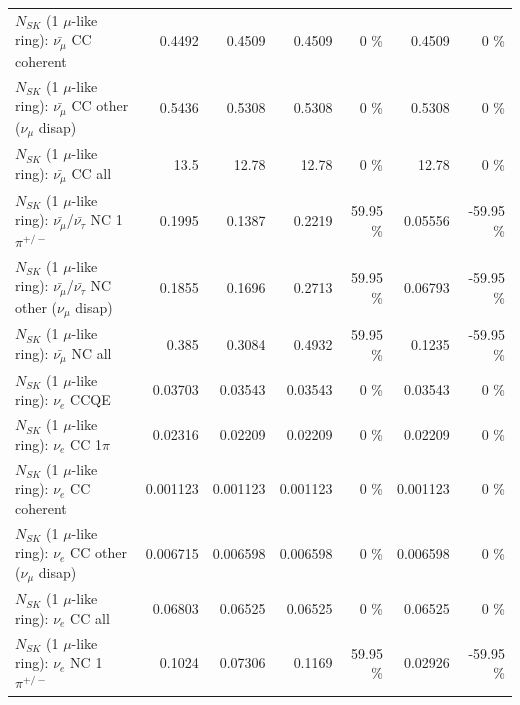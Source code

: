 \begin{table}
\begin{tabular}{| l | r | r | r  r | r  r |}
                       $N_{SK}$ (1 $\mu$-like ring): $\bar{\nu_\mu}$ CC coherent &          0.4492 &          0.4509 &          0.4509 &        0 \%  &          0.4509 &        0 \%  \\ 
        $N_{SK}$ (1 $\mu$-like ring): $\bar{\nu_\mu}$ CC other ($\nu_\mu$ disap) &          0.5436 &          0.5308 &          0.5308 &        0 \%  &          0.5308 &        0 \%  \\ 
                          $N_{SK}$ (1 $\mu$-like ring): $\bar{\nu_{\mu}}$ CC all &            13.5 &           12.78 &           12.78 &        0 \%  &           12.78 &        0 \%  \\ 
\hline
  $N_{SK}$ (1 $\mu$-like ring): $\bar{\nu_\mu}$/$\bar{\nu_\tau}$ NC 1$\pi^{+/-}$ &          0.1995 &          0.1387 &          0.2219 &    59.95 \%  &         0.05556 &   -59.95 \%  \\ 
$N_{SK}$ (1 $\mu$-like ring): $\bar{\nu_\mu}$/$\bar{\nu_\tau}$ NC other ($\nu_\mu$ disap) &          0.1855 &          0.1696 &          0.2713 &    59.95 \%  &         0.06793 &   -59.95 \%  \\ 
                          $N_{SK}$ (1 $\mu$-like ring): $\bar{\nu_{\mu}}$ NC all &           0.385 &          0.3084 &          0.4932 &    59.95 \%  &          0.1235 &   -59.95 \%  \\ 
\hline
\hline
\hline
                                      $N_{SK}$ (1 $\mu$-like ring): $\nu_e$ CCQE &         0.03703 &         0.03543 &         0.03543 &        0 \%  &         0.03543 &        0 \%  \\ 
                                 $N_{SK}$ (1 $\mu$-like ring): $\nu_e$ CC 1$\pi$ &         0.02316 &         0.02209 &         0.02209 &        0 \%  &         0.02209 &        0 \%  \\ 
                               $N_{SK}$ (1 $\mu$-like ring): $\nu_e$ CC coherent &        0.001123 &        0.001123 &        0.001123 &        0 \%  &        0.001123 &        0 \%  \\ 
                $N_{SK}$ (1 $\mu$-like ring): $\nu_e$ CC other ($\nu_\mu$ disap) &        0.006715 &        0.006598 &        0.006598 &        0 \%  &        0.006598 &        0 \%  \\ 
                                  $N_{SK}$ (1 $\mu$-like ring): $\nu_{e}$ CC all &         0.06803 &         0.06525 &         0.06525 &        0 \%  &         0.06525 &        0 \%  \\ 
\hline
                           $N_{SK}$ (1 $\mu$-like ring): $\nu_e$ NC 1$\pi^{+/-}$ &          0.1024 &         0.07306 &          0.1169 &    59.95 \%  &         0.02926 &   -59.95 \%  \\ 

\end{tabular}
\end{table}

